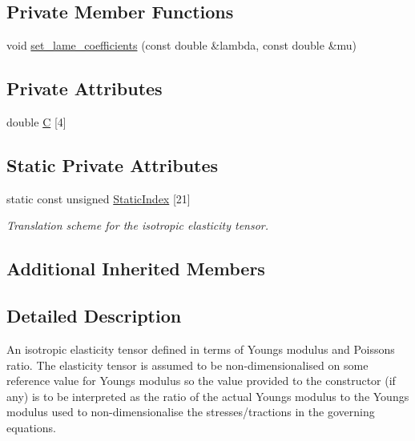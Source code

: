 \subsection*{Private Member Functions}
\begin{DoxyCompactItemize}
\item 
void \hyperlink{classoomph_1_1TimeHarmonicIsotropicElasticityTensor_a96e8a8cb8cc50a09f2e5d1e39defc1a8}{set\+\_\+lame\+\_\+coefficients} (const double \&lambda, const double \&mu)
\end{DoxyCompactItemize}
\subsection*{Private Attributes}
\begin{DoxyCompactItemize}
\item 
double \hyperlink{classoomph_1_1TimeHarmonicIsotropicElasticityTensor_afa7b0b518e23a6cc069b1618033b4947}{C} \mbox{[}4\mbox{]}
\end{DoxyCompactItemize}
\subsection*{Static Private Attributes}
\begin{DoxyCompactItemize}
\item 
static const unsigned \hyperlink{classoomph_1_1TimeHarmonicIsotropicElasticityTensor_a28d880860aa3de7cfc6ebc07ec0a5ee9}{Static\+Index} \mbox{[}21\mbox{]}
\begin{DoxyCompactList}\small\item\em Translation scheme for the isotropic elasticity tensor. \end{DoxyCompactList}\end{DoxyCompactItemize}
\subsection*{Additional Inherited Members}


\subsection{Detailed Description}
An isotropic elasticity tensor defined in terms of Young\textquotesingle{}s modulus and Poisson\textquotesingle{}s ratio. The elasticity tensor is assumed to be non-\/dimensionalised on some reference value for Young\textquotesingle{}s modulus so the value provided to the constructor (if any) is to be interpreted as the ratio of the actual Young\textquotesingle{}s modulus to the Young\textquotesingle{}s modulus used to non-\/dimensionalise the stresses/tractions in the governing equations. 

